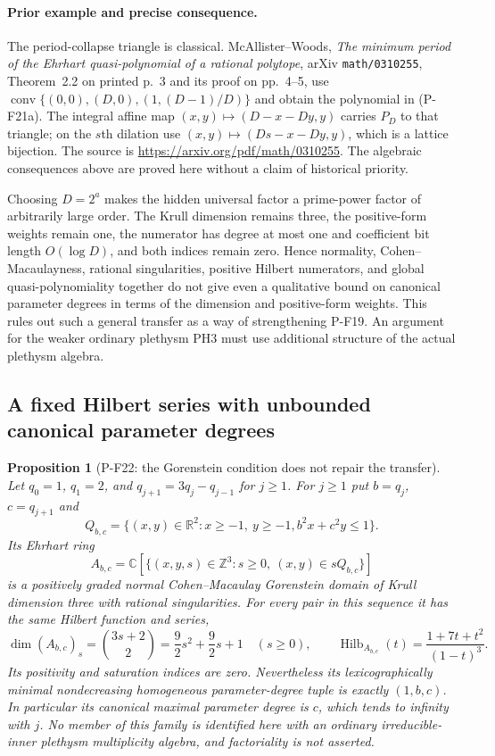 \documentclass[11pt,a4paper]{article}
\newtheorem{proposition}{Proposition}[section]
\begin{document}
\paragraph{Prior example and precise consequence.}
The period-collapse triangle is classical. McAllister--Woods,
\emph{The minimum period of the Ehrhart quasi-polynomial of a
rational polytope}, arXiv \texttt{math/0310255}, Theorem~2.2 on
printed p.~3 and its proof on pp.~4--5, use
$\operatorname{conv}\{(0,0),(D,0),(1,(D-1)/D)\}$ and obtain
the polynomial in (P-F21a). The integral affine map
$(x,y)\mapsto(D-x-Dy,y)$ carries $P_D$ to that triangle;
on the $s$th dilation use $(x,y)\mapsto(Ds-x-Dy,y)$, which
is a lattice bijection. The source is
\url{https://arxiv.org/pdf/math/0310255}.
The algebraic consequences above are proved here without a claim
of historical priority.

Choosing $D=2^a$ makes the hidden universal factor a prime-power
factor of arbitrarily large order. The Krull dimension remains
three, the positive-form weights remain one, the numerator has
degree at most one and coefficient bit length $O(\log D)$, and
both indices remain zero. Hence normality, Cohen--Macaulayness,
rational singularities, positive Hilbert numerators, and global
quasi-polynomiality together do not give even a qualitative bound
on canonical parameter degrees in terms of the dimension and
positive-form weights. This rules out such a general transfer
as a way of strengthening P-F19. An argument for the weaker
ordinary plethysm PH3 must use additional structure of the actual
plethysm algebra.


\subsection{A fixed Hilbert series with unbounded canonical parameter degrees}

\begin{proposition}[P-F22: the Gorenstein condition does not repair the transfer]
\label{prop:gorensteinperiodcollapse}
Let $q_0=1$, $q_1=2$, and $q_{j+1}=3q_j-q_{j-1}$ for $j\ge1$.
For $j\ge1$ put $b=q_j$, $c=q_{j+1}$ and
\[
 Q_{b,c}=\{(x,y)\in\mathbb R^2:x\ge-1,\ y\ge-1,
                       b^2x+c^2y\le1\}.
\]
Its Ehrhart ring
\[
 A_{b,c}=\mathbb C[\{(x,y,s)\in\mathbb Z^3:
                         s\ge0,\ (x,y)\in sQ_{b,c}\}]
\]
is a positively graded normal Cohen--Macaulay Gorenstein domain
of Krull dimension three with rational singularities. For every
pair in this sequence it has the same Hilbert function and series,
\[
 \dim(A_{b,c})_s=\binom{3s+2}{2}
       =\frac92s^2+\frac92s+1\quad(s\ge0),
 \qquad
 \operatorname{Hilb}_{A_{b,c}}(t)=\frac{1+7t+t^2}{(1-t)^3}.
 \tag{P-F22a}
\]
Its positivity and saturation indices are zero. Nevertheless its
lexicographically minimal nondecreasing homogeneous parameter-degree
tuple is exactly $(1,b,c)$. In particular its canonical maximal
parameter degree is $c$, which tends to infinity with $j$.
No member of this family is identified here with an ordinary
irreducible-inner plethysm multiplicity algebra, and factoriality
is not asserted.
\end{proposition}
\end{document}
